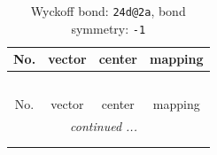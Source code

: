 \documentclass[fleqn,8pt]{jsarticle}
\begin{document}
\renewcommand{\arraystretch}{1.2}
\begin{longtable}{cccc}
\caption{Wyckoff bond: {\tt 24d@2a}, bond symmetry: {\tt -1}}
 \\
 \hline \hline
No. & vector & center & mapping \\ \hline \endfirsthead

\multicolumn{3}{l}{\tablename\ \thetable{}} \\
 \hline \hline
No. & vector & center & mapping \\ \hline \endhead

 \hline \hline
\multicolumn{3}{r}{\footnotesize\it continued ...} \\ \endfoot

 \hline \hline
\multicolumn{3}{r}{} \\ \endlastfoot


\end{longtable}
\end{document}
